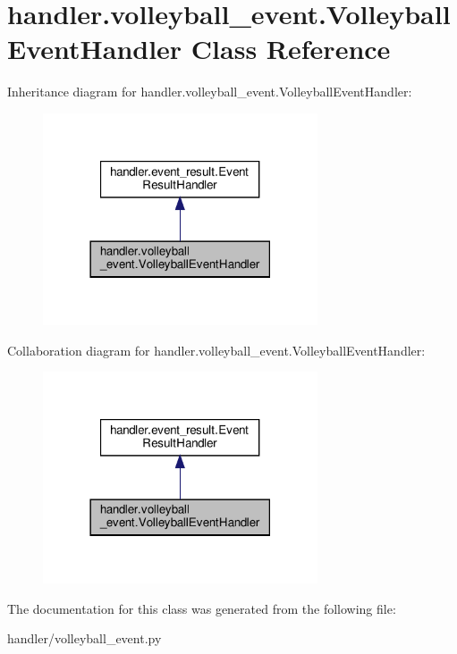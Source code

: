 \hypertarget{classhandler_1_1volleyball__event_1_1_volleyball_event_handler}{}\section{handler.\+volleyball\+\_\+event.\+Volleyball\+Event\+Handler Class Reference}
\label{classhandler_1_1volleyball__event_1_1_volleyball_event_handler}


Inheritance diagram for handler.\+volleyball\+\_\+event.\+Volleyball\+Event\+Handler\+:
\nopagebreak
\begin{figure}[H]
\begin{center}
\leavevmode
\includegraphics[width=230pt]{classhandler_1_1volleyball__event_1_1_volleyball_event_handler__inherit__graph}
\end{center}
\end{figure}


Collaboration diagram for handler.\+volleyball\+\_\+event.\+Volleyball\+Event\+Handler\+:
\nopagebreak
\begin{figure}[H]
\begin{center}
\leavevmode
\includegraphics[width=230pt]{classhandler_1_1volleyball__event_1_1_volleyball_event_handler__coll__graph}
\end{center}
\end{figure}


The documentation for this class was generated from the following file\+:\begin{DoxyCompactItemize}
\item 
handler/volleyball\+\_\+event.\+py\end{DoxyCompactItemize}
